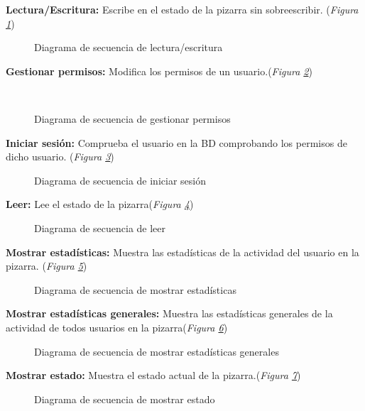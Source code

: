 \textbf{Lectura/Escritura:} Escribe en el estado de la pizarra sin sobreescribir. (\emph{Figura \ref{fig:seqEscrituraLectura}}) 

\begin{figure}[H]
\centering
\seqEscrituraLectura
\caption{Diagrama de secuencia de lectura/escritura}
\label{fig:seqEscrituraLectura}
\end{figure}

\textbf{Gestionar permisos:} Modifica los permisos de un usuario.(\emph{Figura \ref{fig:seqGestionarPermisos}}) 

\begin{figure}[H]
\centering
\
\caption{Diagrama de secuencia de gestionar permisos}
\label{fig:seqGestionarPermisos}
\end{figure}

\textbf{Iniciar sesión:} Comprueba el usuario en la BD comprobando los permisos de dicho usuario. (\emph{Figura \ref{fig:seqIniciarSesion}}) 

\begin{figure}[H]
\centering
\seqIniciarSesion
\caption{Diagrama de secuencia de iniciar sesión}
\label{fig:seqIniciarSesion}
\end{figure}

\textbf{Leer:} Lee el estado de la pizarra(\emph{Figura \ref{fig:seqLeer}}) 

\begin{figure}[H]
\centering
\seqLeer
\caption{Diagrama de secuencia de leer}
\label{fig:seqLeer}
\end{figure}

\textbf{Mostrar estadísticas:} Muestra las estadísticas de la actividad del usuario en la pizarra. (\emph{Figura \ref{fig:seqMostrarEstadisticas}}) 

\begin{figure}[H]
\centering
\seqMostrarEstadisticas
\caption{Diagrama de secuencia de mostrar estadísticas}
\label{fig:seqMostrarEstadisticas}
\end{figure}

\textbf{Mostrar estadísticas generales:} Muestra las estadísticas generales de la actividad de todos usuarios en la pizarra(\emph{Figura \ref{fig:seqMostrarEstadisticasGenerales}}) 

\begin{figure}[H]
\centering
\seqMostrarEstadisticasGenerales
\caption{Diagrama de secuencia de mostrar estadísticas generales}
\label{fig:seqMostrarEstadisticasGenerales}
\end{figure}

\textbf{Mostrar estado:} Muestra el estado actual de la pizarra.(\emph{Figura \ref{fig:seqMostrarEstado}}) 

\begin{figure}[H]
\centering
\seqMostrarEstado
\caption{Diagrama de secuencia de mostrar estado}
\label{fig:seqMostrarEstado}
\end{figure}








